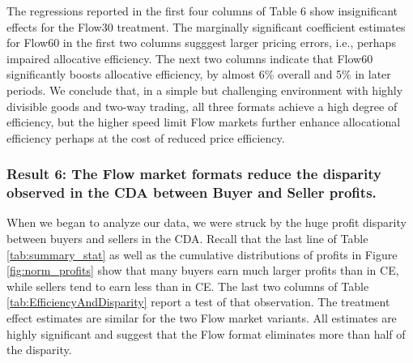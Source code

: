 \documentclass[12pt]{article}
\begin{document}
The regressions reported in the first four columns of Table 6 show insignificant effects for the Flow30 treatment. The marginally significant coefficient estimates for Flow60 in the first two columns sugggest larger pricing errors, i.e., perhaps impaired allocative efficiency. 
The next two columns indicate that Flow60 significantly boosts allocative efficiency, by almost 6\% overall and 5\% in later periods. 
We conclude that, in a simple but challenging environment with highly divisible goods and two-way trading, all three formats achieve a high degree of efficiency, but the higher speed limit Flow markets further enhance allocational efficiency perhaps at the cost of reduced price efficiency. 

\subsubsection*{Result 6: The Flow market formats reduce the disparity observed in the CDA between Buyer and Seller profits.}

When we began to analyze our data, we were struck by the huge profit disparity between buyers and sellers
in the CDA. Recall that the last line of Table \ref{tab:summary_stat} as well as the cumulative distributions of profits in Figure \ref{fig:norm_profits} show that many buyers earn much larger profits than in CE, while sellers tend to earn less than in CE. 
The last two columns of Table \ref{tab:EfficiencyAndDisparity} report a test of that observation.
The treatment effect estimates are similar for the two Flow market variants.
All estimates are highly significant and suggest that 
the Flow format eliminates more than half of the disparity.
\end{document}
